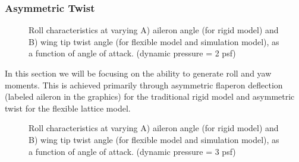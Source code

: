 \documentclass[11pt]{ucthesis}
\begin{document}
\subsubsection{Asymmetric Twist}
\begin{figure}
\hfill
{}
\hfill
{}
\hfill
\caption{Roll characteristics at varying A) aileron angle (for rigid model) and B) wing tip twist angle (for flexible model and simulation model), as a function of angle of attack. (dynamic pressure = 2 psf)}
\label{fig:Q2Roll}
\end{figure}

In this section we will be focusing on the ability to generate roll and yaw moments. This is achieved primarily through asymmetric flaperon deflection (labeled aileron in the graphics) for the traditional rigid model and asymmetric twist for the flexible lattice model.

\begin{figure}
\hfill
{}
\hfill
{}
\hfill
\caption{Roll characteristics at varying A) aileron angle (for rigid model) and B) wing tip twist angle (for flexible model and simulation model), as a function of angle of attack. (dynamic pressure = 3 psf)}
\label{fig:Q3Roll}
\end{figure}
\end{document}
